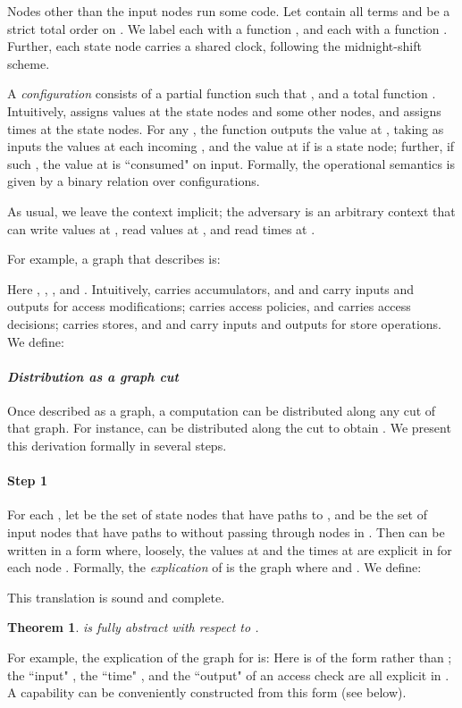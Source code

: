 \documentclass[10pt]{article}
\newtheorem{theorem}{Theorem}
\begin{document}
Nodes other than the input nodes run some code. Let  contain all terms and  be a strict total order on . We label each  with a function , and each  with a function . Further, each state node carries a shared clock, following the midnight-shift scheme. 

A \emph{configuration}  consists of a partial function  such that , and a total function . Intuitively,  assigns values at the state nodes and some other nodes, and  assigns times at the state nodes. For any , the function  outputs the value at , taking as inputs the values at each incoming , and the value at  if  is a state node; further, if such , the value at  is ``consumed" on input. Formally, the operational semantics is given by a binary relation  over configurations.


As usual, we leave the context implicit; the adversary is an arbitrary context that can write values at , read values at , and read times at .

For example, a graph that describes  is:

Here , , , and . Intuitively,  carries accumulators, and  and  carry inputs and outputs for access modifications;  carries access policies, and  carries access decisions;  carries stores, and  and  carry inputs and outputs for store operations. We define: 


\paragraph{\em Distribution as a graph cut}
\noindent
Once described as a graph, a computation can be distributed along any cut of that graph. For instance,  can be distributed along the cut  to obtain . We present this derivation formally in several steps. 


\paragraph{Step 1} 
For each , let  be the set of state nodes that have paths to , and  be the set of input nodes that have paths to  without passing through nodes in .   Then  can be written in a form where, loosely, the values at  and the times at  are explicit in  for each node .  
Formally, the \emph{explication} of  is the graph  where  and . We define:



This translation is sound and complete. 
\begin{theorem}\label{thm:closure}  is fully abstract with respect to .
\end{theorem}
\noindent
For example, the explication of the graph for  is:
Here  is of the form  rather than ;  the ``input" , the ``time" , and the ``output"  of an access check are all explicit in . A capability can be conveniently constructed from this form (see below). 
\end{document}
